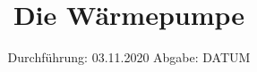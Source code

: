 

\subject{D206}
\title{Die Wärmepumpe}
\date{%
  Durchführung: 03.11.2020
  \hspace{3em}
  Abgabe: DATUM
}



\maketitle
\thispagestyle{empty}
\tableofcontents
\newpage






\printbibliography{}


